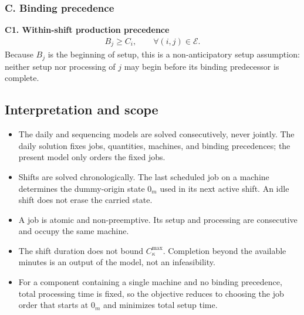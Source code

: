 \documentclass{article}
\begin{document}
\subsubsection{C. Binding precedence}

\noindent\textbf{C1. Within-shift production precedence}
\begin{align}
B_j\geq C_i,
\qquad
\forall(i,j)\in\mathcal{E}.
\label{eq:C1-precedence}
\end{align}
Because $B_j$ is the beginning of setup, this is a non-anticipatory setup
assumption: neither setup nor processing of $j$ may begin before its binding
predecessor is complete.

\subsection{Interpretation and scope}

\begin{itemize}

\item The daily and sequencing models are solved consecutively, never jointly.
The daily solution fixes jobs, quantities, machines, and binding precedences;
the present model only orders the fixed jobs.

\item Shifts are solved chronologically. The last scheduled job on a machine
determines the dummy-origin state $0_m$ used in its next active shift. An idle
shift does not erase the carried state.

\item A job is atomic and non-preemptive. Its setup and processing are
consecutive and occupy the same machine.

\item The shift duration does not bound $C^{\max}_{\kappa}$. Completion beyond
the available minutes is an output of the model, not an infeasibility.

\item For a component containing a single machine and no binding precedence,
total processing time is fixed, so the objective reduces to choosing the
job order that starts at $0_m$ and minimizes total setup time.

\end{itemize}
\end{document}
